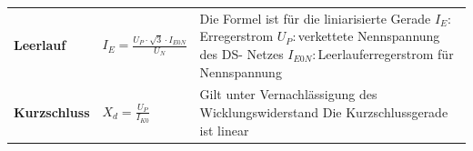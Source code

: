     	\begin{tabular}{ l l p{9cm} }
    		\textbf{Leerlauf}
    		& $I_E = \frac{U_P \cdot \sqrt{3} \cdot I_{E0N}}{U_N}$ 
    		& Die Formel ist für die liniarisierte Gerade \newline
    		  $I_E: $Erregerstrom \newline
    		  $U_P: $verkettete Nennspannung des DS- Netzes\newline
    		  $I_{E0N}:$Leerlauferregerstrom für Nennspannung
    		\\
    		\textbf{Kurzschluss} 
    		& $X_d=\frac{U_P}{I_{K0}}$
    		& Gilt unter Vernachlässigung des Wicklungswiderstand \newline
    		  Die Kurzschlussgerade ist linear
    		\\
    	\end{tabular} 
    	


